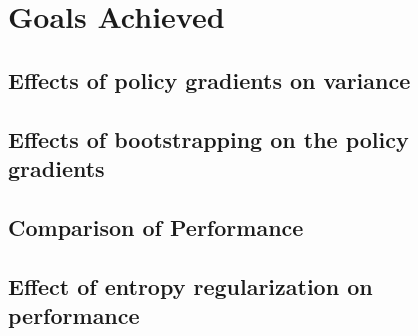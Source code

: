 \documentclass{article}
\begin{document}
\section{Goals Achieved}
\subsection{Effects of policy gradients on variance}
\subsection{Effects of bootstrapping on the policy gradients}
\subsection{Comparison of Performance}
\subsection{Effect of entropy regularization on performance}



\end{document}
